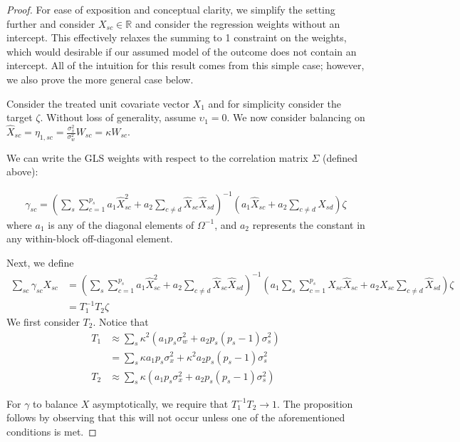 \begin{proof}
For ease of exposition and conceptual clarity, we simplify the setting further and consider $X_{sc} \in \mathbb{R}$ and consider the regression weights without an intercept. This effectively relaxes the summing to 1 constraint on the weights, which would desirable if our assumed model of the outcome does not contain an intercept. All of the intuition for this result comes from this simple case; however, we also prove the more general case below.

Consider the treated unit covariate vector $X_1$ and for simplicity consider the target $\zeta$. Without loss of generality, assume $\upsilon_1 = 0$. We now consider balancing on $\hat{X}_{sc} = \eta_{1, sc} = \frac{\sigma^2_x}{\sigma^2_w}W_{sc} = \kappa W_{sc}$. 

We can write the GLS weights with respect to the correlation matrix $\Sigma$ (defined above):

\begin{align*}
\gamma_{sc} = (\sum_{s}\sum_{c=1}^{p_s} a_1 \hat{X}_{sc}^2 + a_2 \sum_{c\ne d} \hat{X}_{sc}\hat{X}_{sd})^{-1}(a_1\hat{X}_{sc} + a_2\sum_{c\ne d} \hat{X}_{sd})\zeta
\end{align*}
%
where $a_1$ is any of the diagonal elements of $\Omega^{-1}$, and $a_2$ represents the constant in any within-block off-diagonal element. 

Next, we define 
    \begin{align*}
        \sum_{sc} \gamma_{sc} X_{sc} &= (\sum_{s}\sum_{c=1}^{p_s} a_1 \hat{X}_{sc}^2 + a_2 \sum_{c\ne d} \hat{X}_{sc}\hat{X}_{sd})^{-1}(a_1\sum_{s}\sum_{c=1}^{p_s}X_{sc}\hat{X}_{sc} + a_2X_{sc}\sum_{c\ne d} \hat{X}_{sd})\zeta \\
        &= T_1^{-1}T_2\zeta
    \end{align*}
    We first consider $T_2$. Notice that
    \begin{align*}
        T_1 &\approx \sum_s \kappa^2 (a_1 p_s\sigma^2_w + a_2 p_s(p_s - 1)\sigma^2_s)\\
        &= \sum_s \kappa a_1 p_s\sigma^2_x + \kappa^2a_2p_s(p_s - 1)\sigma^2_s \\
        T_2 &\approx \sum_s \kappa (a_1 p_s\sigma^2_x + a_2p_s(p_s - 1)\sigma^2_s)
    \end{align*}
    
    For $\gamma$ to balance $X$ asymptotically, we require that $T_1^{-1}T_2 \to 1$. The proposition follows by observing that this will not occur unless one of the aforementioned conditions is met.
\end{proof}    
    
